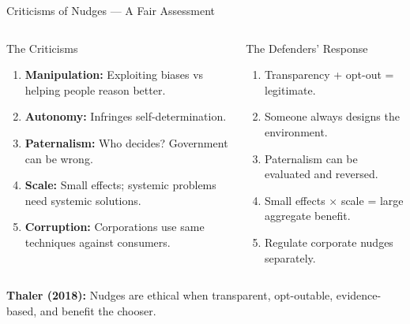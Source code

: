 \documentclass[aspectratio=169]{beamer}
\begin{document}
\begin{frame}{Criticisms of Nudges --- A Fair Assessment}
\begin{columns}
\begin{alertblock}{The Criticisms}
\begin{enumerate}\small
  \item \textbf{Manipulation:} Exploiting biases vs helping people reason better.
  \item \textbf{Autonomy:} Infringes self-determination.
  \item \textbf{Paternalism:} Who decides? Government can be wrong.
  \item \textbf{Scale:} Small effects; systemic problems need systemic solutions.
  \item \textbf{Corruption:} Corporations use same techniques against consumers.
\end{enumerate}
\end{alertblock}
\begin{block}{The Defenders' Response}
\begin{enumerate}\small
  \item Transparency + opt-out = legitimate.
  \item Someone always designs the environment.
  \item Paternalism can be evaluated and reversed.
  \item Small effects $\times$ scale = large aggregate benefit.
  \item Regulate corporate nudges separately.
\end{enumerate}
\end{block}
\end{columns}
\textcolor{beteal}{\textbf{Thaler (2018):}} Nudges are ethical when transparent, opt-outable, evidence-based, and benefit the chooser.
\end{frame}
\end{document}
